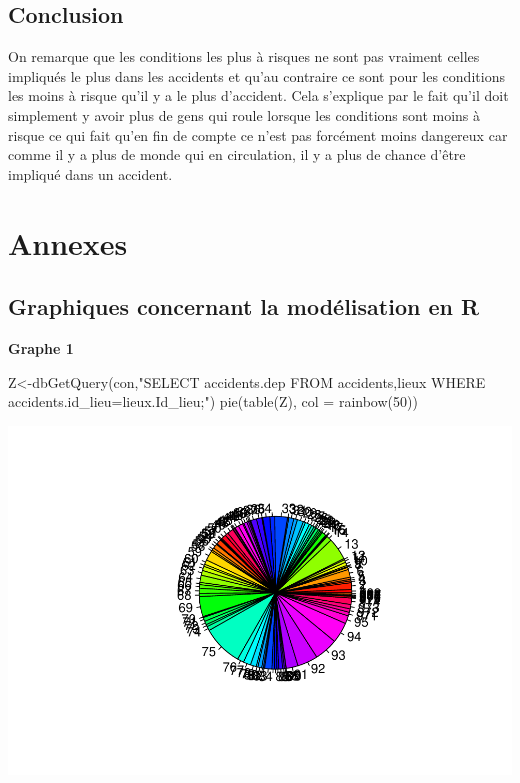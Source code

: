 \documentclass[mstat,12pt]{unswthesis}
\newenvironment{Shaded}{\begin{snugshade}}{\end{snugshade}}
\newcommand{\AttributeTok}[1]{\textcolor[rgb]{0.77,0.63,0.00}{#1}}
\newcommand{\DecValTok}[1]{\textcolor[rgb]{0.00,0.00,0.81}{#1}}
\newcommand{\FunctionTok}[1]{\textcolor[rgb]{0.00,0.00,0.00}{#1}}
\newcommand{\NormalTok}[1]{#1}
\newcommand{\OtherTok}[1]{\textcolor[rgb]{0.56,0.35,0.01}{#1}}
\newcommand{\StringTok}[1]{\textcolor[rgb]{0.31,0.60,0.02}{#1}}
\begin{document}
\bigskip

\hypertarget{conclusion}{%
\section{Conclusion}\label{conclusion}}

\medskip

On remarque que les conditions les plus à risques ne sont pas vraiment
celles impliqués le plus dans les accidents et qu'au contraire ce sont
pour les conditions les moins à risque qu'il y a le plus d'accident.
Cela s'explique par le fait qu'il doit simplement y avoir plus de gens
qui roule lorsque les conditions sont moins à risque ce qui fait qu'en
fin de compte ce n'est pas forcément moins dangereux car comme il y a
plus de monde qui en circulation, il y a plus de chance d'être impliqué
dans un accident.

\hypertarget{annexes}{%
\chapter*{Annexes}\label{annexes}}

\hypertarget{graphiques-concernant-la-moduxe9lisation-en-r}{%
\section*{Graphiques concernant la modélisation en
R}\label{graphiques-concernant-la-moduxe9lisation-en-r}}

\medskip

\textbf{Graphe 1}

\begin{Shaded}
\begin{Highlighting}[]
\NormalTok{Z}\OtherTok{\textless{}{-}}\FunctionTok{dbGetQuery}\NormalTok{(con,}\StringTok{"SELECT accidents.dep}
\StringTok{FROM accidents,lieux}
\StringTok{WHERE accidents.id\_lieu=lieux.Id\_lieu;"}\NormalTok{)}
\FunctionTok{pie}\NormalTok{(}\FunctionTok{table}\NormalTok{(Z), }\AttributeTok{col =} \FunctionTok{rainbow}\NormalTok{(}\DecValTok{50}\NormalTok{))}
\end{Highlighting}
\end{Shaded}

\includegraphics{rapport-G04_files/figure-latex/unnamed-chunk-11-1.pdf}
\end{document}
